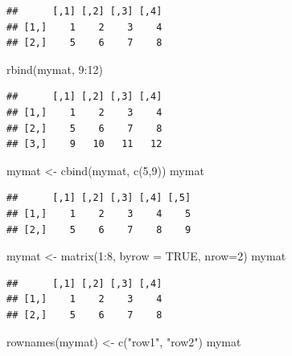 \documentclass[
]{book}
\newenvironment{Shaded}{\begin{snugshade}}{\end{snugshade}}
\newcommand{\AttributeTok}[1]{\textcolor[rgb]{0.77,0.63,0.00}{#1}}
\newcommand{\ConstantTok}[1]{\textcolor[rgb]{0.00,0.00,0.00}{#1}}
\newcommand{\DecValTok}[1]{\textcolor[rgb]{0.00,0.00,0.81}{#1}}
\newcommand{\FunctionTok}[1]{\textcolor[rgb]{0.00,0.00,0.00}{#1}}
\newcommand{\NormalTok}[1]{#1}
\newcommand{\OtherTok}[1]{\textcolor[rgb]{0.56,0.35,0.01}{#1}}
\newcommand{\SpecialCharTok}[1]{\textcolor[rgb]{0.00,0.00,0.00}{#1}}
\newcommand{\StringTok}[1]{\textcolor[rgb]{0.31,0.60,0.02}{#1}}
\begin{document}
\begin{verbatim}
##      [,1] [,2] [,3] [,4]
## [1,]    1    2    3    4
## [2,]    5    6    7    8
\end{verbatim}

\begin{Shaded}
\begin{Highlighting}[]
\FunctionTok{rbind}\NormalTok{(mymat, }\DecValTok{9}\SpecialCharTok{:}\DecValTok{12}\NormalTok{)}
\end{Highlighting}
\end{Shaded}

\begin{verbatim}
##      [,1] [,2] [,3] [,4]
## [1,]    1    2    3    4
## [2,]    5    6    7    8
## [3,]    9   10   11   12
\end{verbatim}

\begin{Shaded}
\begin{Highlighting}[]
\NormalTok{mymat }\OtherTok{\textless{}{-}} \FunctionTok{cbind}\NormalTok{(mymat, }\FunctionTok{c}\NormalTok{(}\DecValTok{5}\NormalTok{,}\DecValTok{9}\NormalTok{))}
\NormalTok{mymat}
\end{Highlighting}
\end{Shaded}

\begin{verbatim}
##      [,1] [,2] [,3] [,4] [,5]
## [1,]    1    2    3    4    5
## [2,]    5    6    7    8    9
\end{verbatim}

\begin{Shaded}
\begin{Highlighting}[]
\NormalTok{mymat  }\OtherTok{\textless{}{-}} \FunctionTok{matrix}\NormalTok{(}\DecValTok{1}\SpecialCharTok{:}\DecValTok{8}\NormalTok{, }\AttributeTok{byrow =} \ConstantTok{TRUE}\NormalTok{, }\AttributeTok{nrow=}\DecValTok{2}\NormalTok{)}
\NormalTok{mymat}
\end{Highlighting}
\end{Shaded}

\begin{verbatim}
##      [,1] [,2] [,3] [,4]
## [1,]    1    2    3    4
## [2,]    5    6    7    8
\end{verbatim}

\begin{Shaded}
\begin{Highlighting}[]
\FunctionTok{rownames}\NormalTok{(mymat) }\OtherTok{\textless{}{-}} \FunctionTok{c}\NormalTok{(}\StringTok{"row1"}\NormalTok{, }\StringTok{"row2"}\NormalTok{)}
\NormalTok{mymat}
\end{Highlighting}
\end{Shaded}
\end{document}
